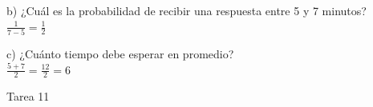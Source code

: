 \documentclass[a4paper, 12pt]{article}
\newcommand{\Aspace}{0.2cm}
\begin{document}
\begin{enumerate}
            \vspace{\Aspace} \par
            b) ¿Cuál es la probabilidad de recibir una respuesta entre 5 y 7 minutos?
            \\ { \color{azul} $\frac{1}{7 - 5} = \frac{1}{2}$ }

            \vspace{\Aspace} \par
            c) ¿Cuánto tiempo debe esperar en promedio?
            \\ { \color{azul} $\frac{5 + 7}{2} = \frac{12}{2} = 6$ }


    \end{enumerate}



    \newpage
    \vspace{0.3cm}

    \begin{center}
        { \LARGE Tarea 11}
    \end{center}
\end{document}
